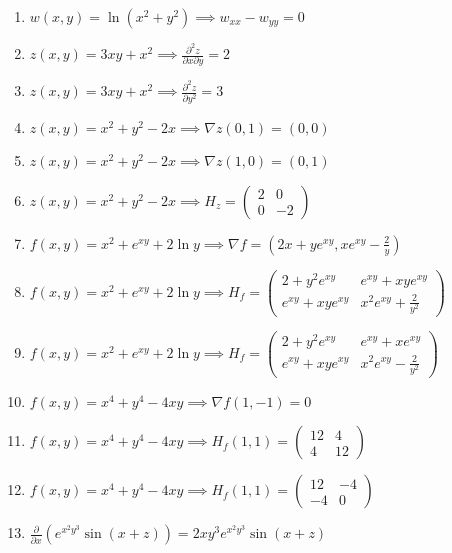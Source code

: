 \documentclass[11pt,a4paper]{article}
\begin{document}
\begin{enumerate}
\item $\displaystyle w(x, y) = \ln(x^{2} + y^{2}) \implies w_{xx} - w_{yy} = 0$
\item $\displaystyle z(x, y) = 3xy + x^{2} \implies \frac{\partial^{2} z}{\partial x \partial y} = 2$
\item $\displaystyle z(x, y) = 3xy + x^{2} \implies \frac{\partial^{2} z}{\partial y^{2}} = 3$
\item $\displaystyle z(x, y) = x^{2} + y^{2} - 2x \implies \nabla z(0, 1) = (0, 0)$
\item $\displaystyle z(x, y) = x^{2} + y^{2} - 2x \implies \nabla z(1, 0) = (0, 1)$
\item $\displaystyle z(x, y) = x^{2} + y^{2} - 2x \implies H_{z} = \begin{pmatrix} 2 & 0 \\ 0 & -2 \end{pmatrix}$
\item $\displaystyle f(x, y) = x^{2} + e^{xy} + 2\ln y \implies \nabla f = \left( 2x + y e^{xy}, x e^{xy} - \frac{2}{y} \right)$
\item $\displaystyle f(x, y) = x^{2} + e^{xy} + 2\ln y \implies H_{f} = \begin{pmatrix} 2 + y^{2} e^{xy} & e^{xy} + xy e^{xy} \\ e^{xy} + xy e^{xy} & x^{2} e^{xy} + \frac{2}{y^{2}} \end{pmatrix}$
\item $\displaystyle f(x, y) = x^{2} + e^{xy} + 2\ln y \implies H_{f} = \begin{pmatrix} 2 + y^{2} e^{xy} & e^{xy} + x e^{xy} \\ e^{xy} + xy e^{xy} & x^{2} e^{xy} - \frac{2}{y^{2}} \end{pmatrix}$
\item $\displaystyle f(x, y) = x^{4} + y^{4} - 4xy \implies \nabla f(1, -1) = 0$
\item $\displaystyle f(x, y) = x^{4} + y^{4} - 4xy \implies H_{f}(1, 1) = \begin{pmatrix} 12 & 4 \\ 4 & 12 \end{pmatrix}$
\item $\displaystyle f(x, y) = x^{4} + y^{4} - 4xy \implies H_{f}(1, 1) = \begin{pmatrix} 12 & -4 \\ -4 & 0 \end{pmatrix}$
\item $\displaystyle \frac{\partial}{\partial x}\left( e^{x^{2} y^{3}} \sin(x + z) \right) = 2xy^{3} e^{x^{2} y^{3}} \sin(x + z)$

\end{enumerate}
\end{document}
